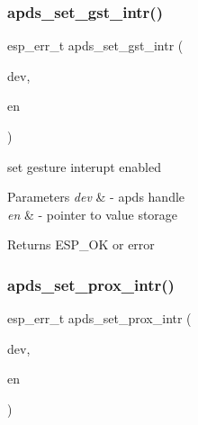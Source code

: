 \subsubsection{\texorpdfstring{apds\+\_\+set\+\_\+gst\+\_\+intr()}{apds\_set\_gst\_intr()}}
{\footnotesize\ttfamily esp\+\_\+err\+\_\+t apds\+\_\+set\+\_\+gst\+\_\+intr (\begin{DoxyParamCaption}\item[{\hyperlink{structAPDS9960__Driver}{A\+P\+D\+S\+\_\+\+D\+EV}}]{dev,  }\item[{\hyperlink{vl53l0x__types_8h_aba7bc1797add20fe3efdf37ced1182c5}{uint8\+\_\+t} $\ast$}]{en }\end{DoxyParamCaption})}




\begin{DoxyItemize}
\item set gesture interupt enabled 
\end{DoxyItemize}


\begin{DoxyParams}{Parameters}
{\em dev} & -\/ apds handle \\
\hline
{\em en} & -\/ pointer to value storage \\
\hline
\end{DoxyParams}
\begin{DoxyReturn}{Returns}
E\+S\+P\+\_\+\+OK or error 
\end{DoxyReturn}
\mbox{\label{group__APDS9960__InterruptFunctions_ga9add3c63fd8e13102600968d13b4662e}} 
\subsubsection{\texorpdfstring{apds\+\_\+set\+\_\+prox\+\_\+intr()}{apds\_set\_prox\_intr()}}
{\footnotesize\ttfamily esp\+\_\+err\+\_\+t apds\+\_\+set\+\_\+prox\+\_\+intr (\begin{DoxyParamCaption}\item[{\hyperlink{structAPDS9960__Driver}{A\+P\+D\+S\+\_\+\+D\+EV}}]{dev,  }\item[{\hyperlink{vl53l0x__types_8h_aba7bc1797add20fe3efdf37ced1182c5}{uint8\+\_\+t} $\ast$}]{en }\end{DoxyParamCaption})}




